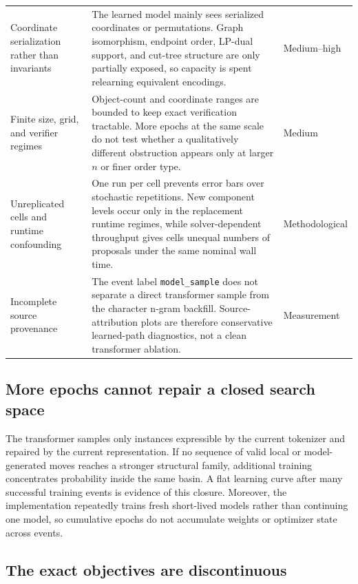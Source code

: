 \documentclass[11pt]{article}
\newcommand{\code}[1]{\texttt{#1}}
\begin{document}
\begin{table}[p]
\begin{tabularx}{\textwidth}{p{}Xp{}}
Coordinate serialization rather than invariants & The learned model mainly
sees serialized coordinates or permutations.  Graph isomorphism, endpoint
order, LP-dual support, and cut-tree structure are only partially exposed, so
capacity is spent relearning equivalent encodings. & Medium--high \\

Finite size, grid, and verifier regimes & Object-count and coordinate ranges
are bounded to keep exact verification tractable.  More epochs at the same
scale do not test whether a qualitatively different obstruction appears only
at larger $n$ or finer order type. & Medium \\

Unreplicated cells and runtime confounding & One run per cell prevents error
bars over stochastic repetitions.  New component levels occur only in the
replacement runtime regimes, while solver-dependent throughput gives cells
unequal numbers of proposals under the same nominal wall time. & Methodological \\

Incomplete source provenance & The event label \code{model\_sample} does not
separate a direct transformer sample from the character n-gram backfill.
Source-attribution plots are therefore conservative learned-path diagnostics,
not a clean transformer ablation. & Measurement \\
\bottomrule
\end{tabularx}
\end{table}

\subsection{More epochs cannot repair a closed search space}

The transformer samples only instances expressible by the current tokenizer
and repaired by the current representation.  If no sequence of valid local or
model-generated moves reaches a stronger structural family, additional
training concentrates probability inside the same basin.  A flat learning
curve after many successful training events is evidence of this closure.
Moreover, the implementation repeatedly trains fresh short-lived models
rather than continuing one model, so cumulative epochs do not accumulate
weights or optimizer state across events.

\subsection{The exact objectives are discontinuous}
\end{document}

